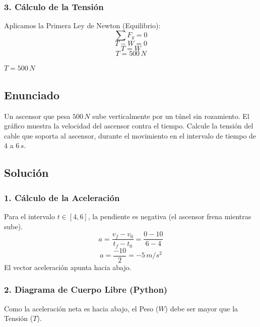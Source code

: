 \documentclass[12pt, a4paper]{article}
\begin{document}
\subsubsection*{3. Cálculo de la Tensión}
Aplicamos la Primera Ley de Newton (Equilibrio):
$$ \sum F_y = 0 $$
$$ T - W = 0 $$
$$ T = W $$
$$ \boxed{T = 500 \, \si{N}} $$

\begin{tcolorbox}[colback=green!5!white, colframe=green!50!black, title=Respuesta Final]
\centering \Large $T = 500 \, \si{N}$
\end{tcolorbox}

\newpage

\subsection*{Enunciado}
Un ascensor que pesa $500 \, \si{N}$ sube verticalmente por un túnel sin rozamiento. El gráfico muestra la velocidad del ascensor contra el tiempo. Calcule la tensión del cable que soporta al ascensor, durante el movimiento en el intervalo de tiempo de $4$ a $6 \, \si{s}$.

\begin{center}
\end{center}

\subsection*{Solución}

\subsubsection*{1. Cálculo de la Aceleración}
Para el intervalo $t \in [4, 6]$, la pendiente es negativa (el ascensor frena mientras sube).
$$ a = \frac{v_f - v_0}{t_f - t_0} = \frac{0 - 10}{6 - 4} $$
$$ a = \frac{-10}{2} = -5 \, \si{m/s^2} $$
El vector aceleración apunta hacia abajo.

\subsubsection*{2. Diagrama de Cuerpo Libre (Python)}
Como la aceleración neta es hacia abajo, el Peso ($W$) debe ser mayor que la Tensión ($T$).
\end{document}
